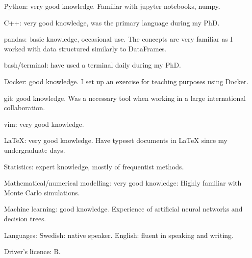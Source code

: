 



\begin{cvskills}


\cvskill
{Python:}
{very good knowledge. Familiar with jupyter notebooks, numpy.}

\cvskill
{C++:}
{very good knowledge, was the primary language during my PhD.}

\cvskill
{pandas:}
{basic knowledge, occasional use. The concepts are very familiar as I worked with data structured \newline similarly to DataFrames.}

\cvskill
{bash/terminal:}
{have used a terminal daily during my PhD.}

\cvskill
{Docker:} 
{good knowledge. I set up an exercise for teaching purposes using Docker.}

\cvskill
{git:}
{good knowledge. Was a necessary tool when working in a large international collaboration.}

\cvskill
{vim:}
{very good knowledge.}

\cvskill
{LaTeX:}
{very good knowledge. Have typeset documents in LaTeX since my undergraduate days.}

\cvskill
{Statistics:} 
{expert knowledge, mostly of frequentist methods.}

\cvskill
{Mathematical/numerical modelling:}
{very good knowledge: Highly familiar with Monte Carlo simulations.}

\cvskill
{Machine learning:}
{good knowledge. Experience of artificial neural networks and decision trees.}

\cvskill
{Languages:}
{Swedish: native speaker. English: fluent in speaking and writing.}

\cvskill
{Driver's licence:}
{B.}


\end{cvskills}